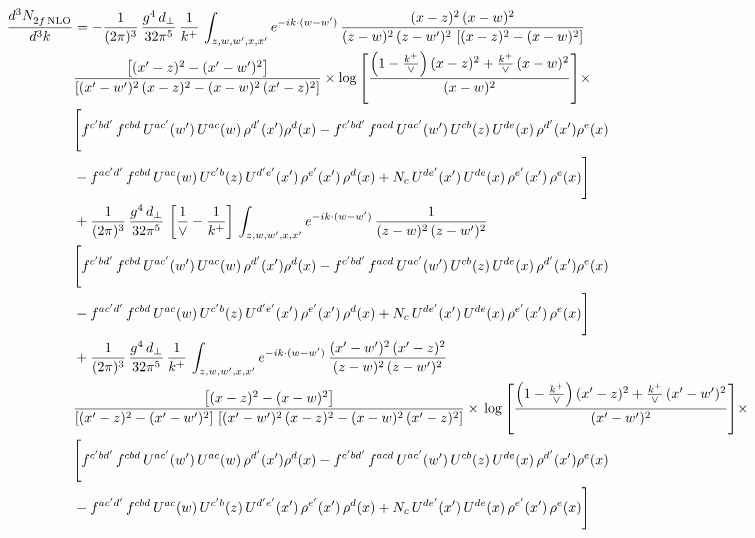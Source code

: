 \documentclass[9pt]{article}
\numberwithin{equation}{section}
\begin{document}
\begin{align}
    \frac{d^{3}N_{2f\,\rm NLO}^{\rm}}{d^{3}k}  & =   - \frac{1}{(2\pi)^{3}}\, \frac{g^{4}\,d_{\perp}}{32\pi^{5}}\,\frac{1}{k^{+}}\,\int_{z,w,w^{\prime},x,x'} e^{-ik\cdot (w-w')}\,\frac{(x-z)^{2}\, (x-w)^{2}}{(z-w)^{2}\, (z-w')^{2}\,\left[(x-z)^{2} - (x-w)^{2}\right]}\notag \\ & \frac{\left[(x'-z)^{2}-(x'-w')^{2}\right]}{\left[(x'-w')^{2}\, (x-z)^{2} - (x-w)^{2}\, (x'-z)^{2}\right]}\times \log{\left[\frac{\left(1-\frac{k^{+}}{\vee}\right)(x-z)^{2}+\frac{k^{+}}{\vee}\,(x-w)^{2}}{(x-w)^{2}}\right]}\times\notag \\ & \Bigg[f^{c'bd'}\,f^{cbd}\, U^{ac'}(w')\,U^{ac}(w)\,\rho^{d'}(x')\rho^{d}(x)- f^{c'bd'}\,f^{acd}\,U^{ac'}(w')\,U^{cb}(z)\,U^{de}(x)\,\rho^{d'}(x')\rho^{e}(x) \notag \\ & -f^{ac'd'}\,f^{cbd}\,U^{ac}(w)\,U^{c'b}(z)\,U^{d'e'}(x')\,\rho^{e'}(x')\,\rho^{d}(x) +N_{c}\,U^{de'}(x')\,U^{de}(x)\,\rho^{e'}(x')\,\rho^{e}(x)\Bigg]  \notag \\
& + \frac{1}{(2\pi)^{3}}\, \frac{g^{4}\,d_{\perp}}{32\pi^{5}}\,\left[\frac{1}{\vee} - \frac{1}{k^{+}}\right]\,\int_{z,w,w^{\prime},x,x'} e^{-ik\cdot (w-w')}\,\frac{1}{(z-w)^{2}\, (z-w')^{2}}\notag \\ & \Bigg[f^{c'bd'}\,f^{cbd}\, U^{ac'}(w')\,U^{ac}(w)\,\rho^{d'}(x')\rho^{d}(x)- f^{c'bd'}\,f^{acd}\,U^{ac'}(w')\,U^{cb}(z)\,U^{de}(x)\,\rho^{d'}(x')\rho^{e}(x) \notag \\ & -f^{ac'd'}\,f^{cbd}\,U^{ac}(w)\,U^{c'b}(z)\,U^{d'e'}(x')\,\rho^{e'}(x')\,\rho^{d}(x) +N_{c}\,U^{de'}(x')\,U^{de}(x)\,\rho^{e'}(x')\,\rho^{e}(x)\Bigg]  \notag \\
& + \frac{1}{(2\pi)^{3}}\, \frac{g^{4}\,d_{\perp}}{32\pi^{5}}\,\frac{1}{k^{+}}\,\int_{z,w,w^{\prime},x,x'} e^{-ik\cdot (w-w')}\,\frac{(x'-w')^{2}\, (x'-z)^{2}}{(z-w)^{2}\, (z-w')^{2}}\notag \\ & \frac{\left[(x-z)^{2} - (x-w)^{2}\right]}{\left[(x'-z)^{2} - (x'-w')^{2}\right]\, \left[(x'-w')^{2}\, (x - z)^{2} - (x-w)^{2}\,(x'-z)^{2}\right]}\times\, \log{\left[\frac{\left(1-\frac{k^{+}}{\vee}\right)(x'-z)^{2}+\frac{k^{+}}{\vee}\,(x'-w')^{2}}{(x'-w')^{2}}\right]}\times \notag \\ &  \Bigg[f^{c'bd'}\,f^{cbd}\, U^{ac'}(w')\,U^{ac}(w)\,\rho^{d'}(x')\rho^{d}(x)- f^{c'bd'}\,f^{acd}\,U^{ac'}(w')\,U^{cb}(z)\,U^{de}(x)\,\rho^{d'}(x')\rho^{e}(x) \notag \\ & -f^{ac'd'}\,f^{cbd}\,U^{ac}(w)\,U^{c'b}(z)\,U^{d'e'}(x')\,\rho^{e'}(x')\,\rho^{d}(x) +N_{c}\,U^{de'}(x')\,U^{de}(x)\,\rho^{e'}(x')\,\rho^{e}(x)\Bigg]
\end{align}
\end{document}

